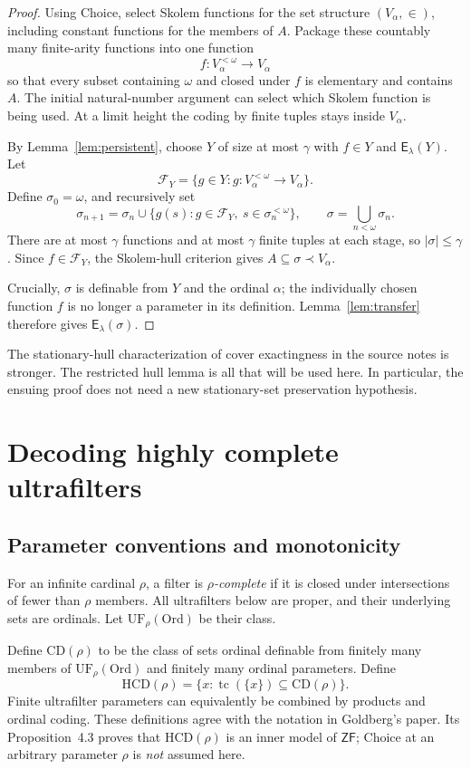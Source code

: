 \documentclass[11pt,letterpaper]{article}
\theoremstyle{definition}
\newcommand{\ZF}{\mathsf{ZF}}
\newcommand{\Ord}{\mathrm{Ord}}
\newcommand{\CD}{\mathrm{CD}}
\newcommand{\HCD}{\mathrm{HCD}}
\newcommand{\UF}{\mathrm{UF}}
\newcommand{\tc}{\operatorname{tc}}
\newcommand{\Erel}{\mathsf{E}}
\begin{document}
\begin{proof}
Using Choice, select Skolem functions for the set structure $(V_\alpha,\in)$, including constant functions for the members of $A$. Package these countably many finite-arity functions into one function
\[
 f:V_\alpha^{<\omega}\longrightarrow V_\alpha
\]
so that every subset containing $\omega$ and closed under $f$ is elementary and contains $A$. The initial natural-number argument can select which Skolem function is being used. At a limit height the coding by finite tuples stays inside $V_\alpha$.

By Lemma~\ref{lem:persistent}, choose $Y$ of size at most $\gamma$ with $f\in Y$ and $\Erel_\lambda(Y)$. Let
\[
 \mathcal F_Y=\{g\in Y:g:V_\alpha^{<\omega}\to V_\alpha\}.
\]
Define $\sigma_0=\omega$, and recursively set
\[
 \sigma_{n+1}=\sigma_n\cup
   \{g(s):g\in\mathcal F_Y,\ s\in\sigma_n^{<\omega}\},
 \qquad \sigma=\bigcup_{n<\omega}\sigma_n.
\]
There are at most $\gamma$ functions and at most $\gamma$ finite tuples at each stage, so $|\sigma|\leq\gamma$. Since $f\in\mathcal F_Y$, the Skolem-hull criterion gives $A\subseteq\sigma\prec V_\alpha$.

Crucially, $\sigma$ is definable from $Y$ and the ordinal $\alpha$; the individually chosen function $f$ is no longer a parameter in its definition. Lemma~\ref{lem:transfer} therefore gives $\Erel_\lambda(\sigma)$.
\end{proof}

The stationary-hull characterization of cover exactingness in the source notes is stronger. The restricted hull lemma is all that will be used here. In particular, the ensuing proof does not need a new stationary-set preservation hypothesis.

\section{Decoding highly complete ultrafilters}\label{sec:decoding}

\subsection{Parameter conventions and monotonicity}

For an infinite cardinal $\rho$, a filter is \emph{$\rho$-complete} if it is closed under intersections of fewer than $\rho$ members. All ultrafilters below are proper, and their underlying sets are ordinals. Let $\UF_\rho(\Ord)$ be their class.

Define $\CD(\rho)$ to be the class of sets ordinal definable from finitely many members of $\UF_\rho(\Ord)$ and finitely many ordinal parameters. Define
\[
 \HCD(\rho)=\{x:\tc(\{x\})\subseteq\CD(\rho)\}.
\]
Finite ultrafilter parameters can equivalently be combined by products and ordinal coding. These definitions agree with the notation in Goldberg's paper. Its Proposition~4.3 proves that $\HCD(\rho)$ is an inner model of $\ZF$; Choice at an arbitrary parameter $\rho$ is \emph{not} assumed here.\cite{uniqueness}
\end{document}

